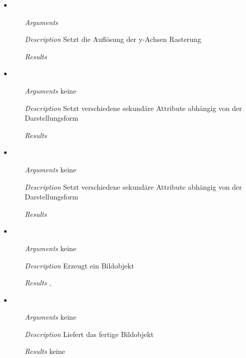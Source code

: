 \begin{itemize}
\item {}
\begin{enumerate}
\item[\textit{Arguments}] 
\item[\textit{Description}] Setzt die Aufl\"osung der y-Achsen
  Rasterung
\item[\textit{Results}] 
\end{enumerate}

\item {}
\begin{enumerate}
\item[\textit{Arguments}] keine
\item[\textit{Description}] Setzt verschiedene sekund\"are Attribute
  abh\"angig von der Darstellungsform
\item[\textit{Results}] 
\end{enumerate}

\item {}
\begin{enumerate}
\item[\textit{Arguments}] keine
\item[\textit{Description}] Setzt verschiedene sekund\"are Attribute
  abh\"angig von der Darstellungsform
\item[\textit{Results}] 
\end{enumerate}

\item {}
\begin{enumerate}
\item[\textit{Arguments}] keine
\item[\textit{Description}] Erzeugt ein Bildobjekt
\item[\textit{Results}] ,
\end{enumerate}

\item {}
\begin{enumerate}
\item[\textit{Arguments}] keine
\item[\textit{Description}] Liefert das fertige Bildobjekt
\item[\textit{Results}] keine
\end{enumerate}


\end{itemize}

